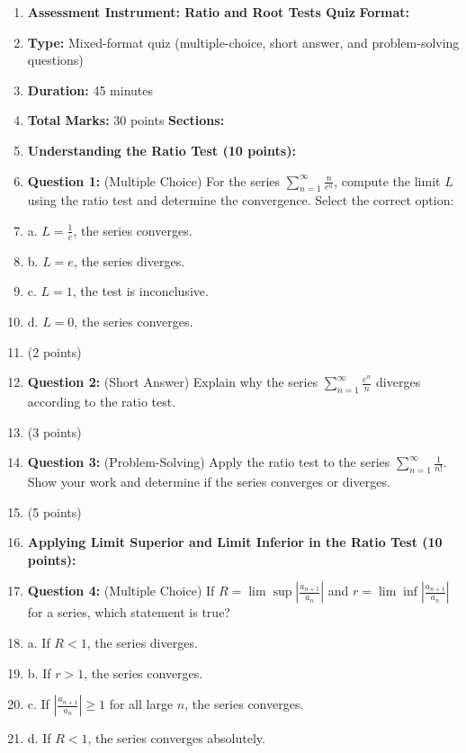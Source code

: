 \begin{enumerate}
    \item \textbf{Assessment Instrument: Ratio and Root Tests Quiz} \textbf{Format:}
    \item \textbf{Type:} Mixed-format quiz (multiple-choice, short answer, and problem-solving questions)
    \item \textbf{Duration:} 45 minutes
    \item \textbf{Total Marks:} 30 points \textbf{Sections:}
    \item \textbf{Understanding the Ratio Test (10 points):}
    \item \textbf{Question 1:} (Multiple Choice) For the series \( \sum_{n=1}^\infty \frac{n}{e^n} \), compute the limit \( L \) using the ratio test and determine the convergence. Select the correct option:
    \item a. \( L = \frac{1}{e} \), the series converges.
    \item b. \( L = e \), the series diverges.
    \item c. \( L = 1 \), the test is inconclusive.
    \item d. \( L = 0 \), the series converges.
    \item (2 points)
    \item \textbf{Question 2:} (Short Answer) Explain why the series \( \sum_{n=1}^\infty \frac{e^n}{n} \) diverges according to the ratio test.
    \item (3 points)
    \item \textbf{Question 3:} (Problem-Solving) Apply the ratio test to the series \( \sum_{n=1}^\infty \frac{1}{n!} \). Show your work and determine if the series converges or diverges.
    \item (5 points)
    \item \textbf{Applying Limit Superior and Limit Inferior in the Ratio Test (10 points):}
    \item \textbf{Question 4:} (Multiple Choice) If \( R = \lim\sup \left|\frac{a_{n+1}}{a_n}\right| \) and \( r = \lim\inf \left|\frac{a_{n+1}}{a_n}\right| \) for a series, which statement is true?
    \item a. If \( R < 1 \), the series diverges.
    \item b. If \( r > 1 \), the series converges.
    \item c. If \( \left|\frac{a_{n+1}}{a_n}\right| \ge 1 \) for all large \( n \), the series converges.
    \item d. If \( R < 1 \), the series converges absolutely.

\end{enumerate}
